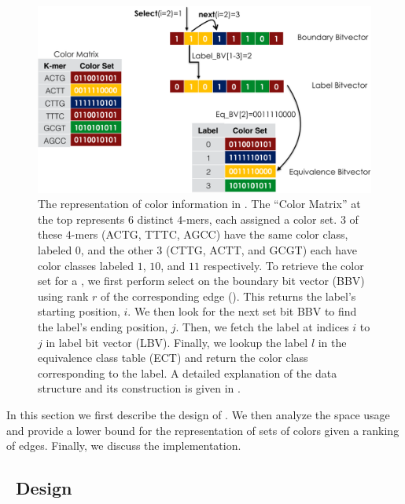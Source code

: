 \begin{figure}[t]
  \centering
  \includegraphics[width=\textwidth]{figs/cdbg-cropped}
  \caption{
    The representation of color information in \rainbowfish. The ``Color Matrix'' at
    the top represents $6$ distinct $4$-mers, each assigned a color set. $3$ of
    these $4$-mers (ACTG, TTTC, AGCC) have the same color class, labeled $0$,
    and the other $3$ (CTTG, ACTT, and GCGT) each have color classes labeled
    $1$, $10$, and $11$ respectively. To retrieve the color set for a \kmer, we
    first perform select on the boundary bit vector (BBV) using rank $r$ of the
    corresponding edge (\kmer). This returns the label's starting position, $i$.
    We then look for the next set bit BBV to find the label's ending position,
    $j$. Then, we fetch the label at indices $i$ to $j$ in label bit vector
    (LBV). Finally, we lookup the label $l$ in the equivalence class table (ECT)
    and return the color class corresponding to the label. A detailed
    explanation of the data structure and its construction is given in
    .
  }
    \label{fig:cdbg-rep}
\end{figure}

In this section we first describe the design of \rainbowfish. We then analyze the
space usage and provide a lower bound for the representation of sets of colors given
a ranking of \dbg edges. Finally, we discuss the \rainbowfish implementation.

\subsection{~Design}
\label{design}

